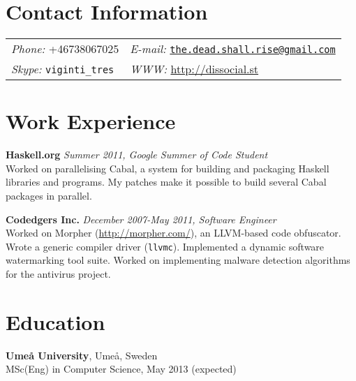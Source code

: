\documentclass[margin,line]{res}
\begin{document}

\begin{resume}
\section{\sc Contact Information}
\vspace{.05in}
\begin{tabular}{@{}p{2in}p{4in}}
{\it Phone:}  +46738067025  &
{\it E-mail:} \href{mailto:the.dead.shall.rise@gmail.com}
{\texttt{the.dead.shall.rise@gmail.com}}\\
{\it Skype:}  \texttt{viginti\_tres} & 
{\it WWW:} \url{http://dissocial.st}\\
\end{tabular}

\section{\sc Work Experience}

{\bf Haskell.org} \hfill {\it Summer 2011, Google Summer of Code Student}\\
Worked on parallelising Cabal, a system for building and packaging Haskell
libraries and programs. My patches make it possible to build several Cabal
packages in parallel.

{\bf Codedgers Inc.} \hfill {\it December 2007-May 2011, Software Engineer}\\
Worked on Morpher (\url{http://morpher.com/}), an LLVM-based code
obfuscator. Wrote a generic compiler driver (\texttt{llvmc}). Implemented a
dynamic software watermarking tool suite. Worked on implementing malware
detection algorithms for the antivirus project.



\section{\sc Education}
{\bf Umeå University}, Umeå, Sweden\\
MSc(Eng) in Computer Science, May 2013 (expected)


\end{resume}
\end{document}
